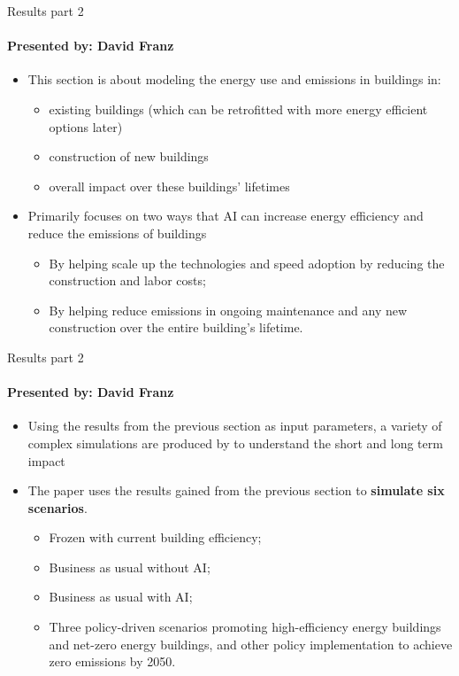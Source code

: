 \documentclass{beamer}
\begin{document}
\begin{frame}{Results part 2}
\framesubtitle{Presented by: David Franz}

\begin{itemize}
    \item  This section is about modeling the energy use and emissions in buildings in:
    \begin{itemize}
        \item existing buildings (which can be retrofitted with more energy efficient options later)
        \item construction of new buildings
        \item  overall impact over these buildings' lifetimes
    \end{itemize}
    \item Primarily focuses on two ways that AI can increase energy efficiency and reduce the emissions of buildings
        \begin{itemize}
            \item By helping scale up the technologies and speed adoption by reducing the construction and labor costs;
            \item By helping reduce emissions in ongoing maintenance and any new construction over the entire building's lifetime.
        \end{itemize}
\end{itemize}
\end{frame}

\begin{frame}{Results part 2}
\framesubtitle{Presented by: David Franz}
\begin{itemize}
    \item Using the results from the previous section as input parameters, a variety of complex simulations are produced by to understand the short and long term impact
    \item The paper uses the results gained from the previous section to \textbf{simulate six scenarios}. 
    \begin{itemize}
        \item Frozen with current building efficiency;
        \item Business as usual without AI;
        \item Business as usual with AI;
        \item Three policy-driven scenarios promoting high-efficiency energy buildings and net-zero energy buildings, and other policy implementation to achieve zero emissions by 2050.
    \end{itemize}
\end{itemize}
\end{frame}
\end{document}
